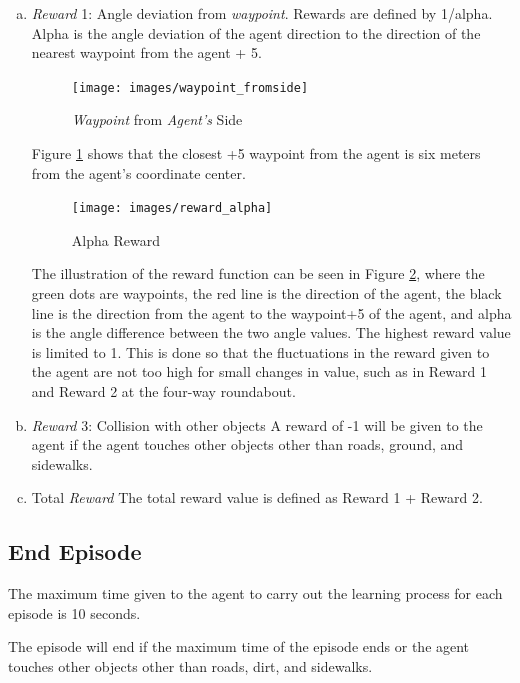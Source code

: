 \documentclass[conference]{IEEEtran}
\begin{document}
\begin{enumerate}[a)]
\item \textit{Reward} 1: Angle deviation from \textit{waypoint}.
Rewards are defined by 1/alpha. Alpha is the angle deviation of the agent direction to the direction of the nearest waypoint from the agent + 5.

\begin{figure}[H] 
	\centering
	\texttt{[image: images/waypoint\_fromside]}
	\caption{\textit{Waypoint }from \textit{Agent's} Side}
	\label{fig:waypoint_fromside}
\end{figure}

Figure \ref{fig:waypoint_fromside} shows that the closest +5 waypoint from the agent is six meters from the agent's coordinate center.

\begin{figure}[H] 
	\centering
	\texttt{[image: images/reward\_alpha]}
	\caption{Alpha Reward}
	\label{fig:reward_alpha}
\end{figure}

The illustration of the reward function can be seen in Figure \ref{fig:reward_alpha}, where the green dots are waypoints, the red line is the direction of the agent, the black line is the direction from the agent to the waypoint+5 of the agent, and alpha is the angle difference between the two angle values. The highest reward value is limited to 1. This is done so that the fluctuations in the reward given to the agent are not too high for small changes in value, such as in Reward 1 and Reward 2 at the four-way roundabout.

\item{\textit{Reward} 3: Collision with other objects}
A reward of -1 will be given to the agent if the agent touches other objects other than roads, ground, and sidewalks.

\item{Total \textit{Reward }}
The total reward value is defined as Reward 1 + Reward 2.

\end{enumerate}


\subsection{End Episode}
\label{sec:end_episode}
The maximum time given to the agent to carry out the learning process for each episode is 10 seconds.

The episode will end if the maximum time of the episode ends or the agent touches other objects other than roads, dirt, and sidewalks.
\end{document}
